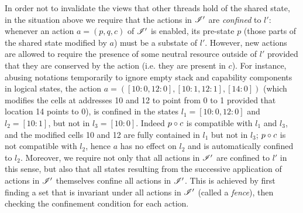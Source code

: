 In order not to invalidate the views that other threads hold of the
shared state, in the situation above we require that the actions in
$\mathscr{I}'$ are \emph{confined} to $l'$: whenever an action $a = (p, q, c)$ of
$\mathscr{I}'$ is enabled, its pre-state $p$ (those parts of the shared state modified by $a$) must be a substate of $l'$. However, new actions are allowed to
require the presence of some neutral resource outside of $l'$ provided that they are conserved by the action (i.e. they are present in $c$).
%
For instance, abusing notations temporarily to ignore empty stack and
capability components in logical states, the action $a = ([10:0, 12:0], [10:1, 12:1], [14:0])$ (which modifies the cells at addresses 10 and 12 to point from 0 to 1 provided that location 14 points to 0), is
confined in the states $l_1=[10:0,12:0]$ and $l_2=[10:1]$, but not in
$l_3=[10:0]$. Indeed $p \circ c$ is compatible with $l_1$ and $l_3$, and the
modified cells 10 and 12 are fully contained in $l_1$ but not in
$l_3$; $p \circ c$ is not compatible with $l_2$, hence $a$ has no effect on
$l_2$ and is automatically confined to $l_2$.
%
Moreover, we require not only that all actions in $\mathscr{I}'$
are confined to $l'$ in this sense, but also that all states resulting
from the successive application of actions in $\mathscr{I}'$ themselves confine
all actions in $\mathscr{I}'$. This is achieved by first finding a set that
is invariant under all actions in $\mathscr{I}'$ (called a \emph{fence}),
then checking the confinement condition for each action.

